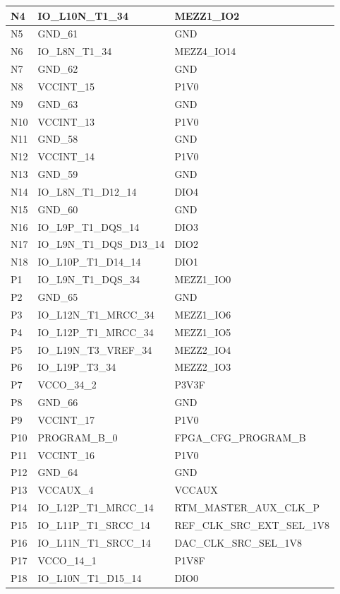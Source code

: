 \begin{footnotesize}
\begin{longtable}{|l|p{6cm}|p{6cm}|}
N4	&	IO\_L10N\_T1\_34	&	MEZZ1\_IO2	\\ \hline
N5	&	GND\_61	&	GND	\\ \hline
N6	&	IO\_L8N\_T1\_34	&	MEZZ4\_IO14	\\ \hline
N7	&	GND\_62	&	GND	\\ \hline
N8	&	VCCINT\_15	&	P1V0	\\ \hline
N9	&	GND\_63	&	GND	\\ \hline
N10	&	VCCINT\_13	&	P1V0	\\ \hline
N11	&	GND\_58	&	GND	\\ \hline
N12	&	VCCINT\_14	&	P1V0	\\ \hline
N13	&	GND\_59	&	GND	\\ \hline
N14	&	IO\_L8N\_T1\_D12\_14	&	DIO4	\\ \hline
N15	&	GND\_60	&	GND	\\ \hline
N16	&	IO\_L9P\_T1\_DQS\_14	&	DIO3	\\ \hline
N17	&	IO\_L9N\_T1\_DQS\_D13\_14	&	DIO2	\\ \hline
N18	&	IO\_L10P\_T1\_D14\_14	&	DIO1	\\ \hline
P1	&	IO\_L9N\_T1\_DQS\_34	&	MEZZ1\_IO0	\\ \hline
P2	&	GND\_65	&	GND	\\ \hline
P3	&	IO\_L12N\_T1\_MRCC\_34	&	MEZZ1\_IO6	\\ \hline
P4	&	IO\_L12P\_T1\_MRCC\_34	&	MEZZ1\_IO5	\\ \hline
P5	&	IO\_L19N\_T3\_VREF\_34	&	MEZZ2\_IO4	\\ \hline
P6	&	IO\_L19P\_T3\_34	&	MEZZ2\_IO3	\\ \hline
P7	&	VCCO\_34\_2	&	P3V3F	\\ \hline
P8	&	GND\_66	&	GND	\\ \hline
P9	&	VCCINT\_17	&	P1V0	\\ \hline
P10	&	PROGRAM\_B\_0	&	FPGA\_CFG\_PROGRAM\_B	\\ \hline
P11	&	VCCINT\_16	&	P1V0	\\ \hline
P12	&	GND\_64	&	GND	\\ \hline
P13	&	VCCAUX\_4	&	VCCAUX	\\ \hline
P14	&	IO\_L12P\_T1\_MRCC\_14	&	RTM\_MASTER\_AUX\_CLK\_P	\\ \hline
P15	&	IO\_L11P\_T1\_SRCC\_14	&	REF\_CLK\_SRC\_EXT\_SEL\_1V8	\\ \hline
P16	&	IO\_L11N\_T1\_SRCC\_14	&	DAC\_CLK\_SRC\_SEL\_1V8	\\ \hline
P17	&	VCCO\_14\_1	&	P1V8F	\\ \hline
P18	&	IO\_L10N\_T1\_D15\_14	&	DIO0	\\ \hline

\end{longtable}
\end{footnotesize}
